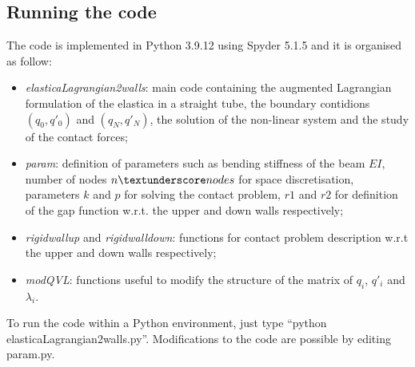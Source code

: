 \subsection{Running the code}

The code is implemented in Python 3.9.12 using Spyder 5.1.5 and it is organised as follow: \begin{itemize}
	\item \textit{elastica\textunderscore Lagrangian\textunderscore 2walls}: main code containing the augmented Lagrangian formulation of the elastica in a straight tube, the boundary contidions $(q_0,q'_0)$ and $(q_N, q'_N)$, the solution of the non-linear system and the study of the contact forces;
	\item \textit{param}: definition of parameters such as bending stiffness of the beam $EI$, number of nodes $n\textunderscore nodes$ for space discretisation, parameters $k$ and $p$ for solving the contact problem, $r1$ and $r2$ for definition of the gap function w.r.t. the upper and down walls respectively;
	\item \textit{rigid\textunderscore wall\textunderscore up} and \textit{rigid\textunderscore wall\textunderscore down}: functions for contact problem description w.r.t the upper and down walls respectively;
	\item \textit{mod\textunderscore QVL}: functions useful to modify the structure of the matrix of $q_i$, $q'_i$ and $\lambda_i$.  
\end{itemize}

To run the code within a Python environment, just type “python elastica\textunderscore Lagrangian\textunderscore 2walls.py”. Modifications to the code are possible by editing param.py.



